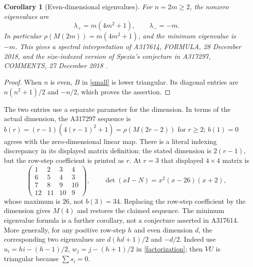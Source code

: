 \documentclass[11pt]{article}
\newtheorem{corollary}[theorem]{Corollary}
\begin{document}
\begin{corollary}[Even-dimensional eigenvalues]\label{even}
For $n=2m\geq2$, the nonzero eigenvalues are
\[
 \lambda_+=m(4m^2+1),\qquad \lambda_-=-m.
\]
In particular $\rho(M(2m))=m(4m^2+1)$, and the minimum eigenvalue
is $-m$. This gives a spectral interpretation of A317614, FORMULA,
28 December 2018, and the size-indexed version of Spezia's conjecture
in A317297, COMMENTS, 27 December 2018 \cite{eigen}.
\end{corollary}
\begin{proof}
When $n$ is even, $B$ in \eqref{small} is lower triangular. Its diagonal
entries are $n(n^2+1)/2$ and $-n/2$, which proves the assertion.
\end{proof}
The two entries use a separate parameter for the dimension.
In terms of the actual dimension, the A317297 sequence is
$b(r)=(r-1)(4(r-1)^2+1)=\rho(M(2r-2))$ for $r\geq2$;
$b(1)=0$ agrees with the zero-dimensional linear map.
There is a literal indexing discrepancy in its displayed matrix definition:
the stated dimension is $2(r-1)$, but the row-step coefficient is printed
as $r$. At $r=3$ that displayed $4\times4$ matrix is
\[
 \begin{pmatrix}1&2&3&4\\6&5&4&3\\7&8&9&10\\12&11&10&9\end{pmatrix},
 \qquad \det(xI-N)=x^2(x-26)(x+2),
\]
whose maximum is $26$, not $b(3)=34$. Replacing the row-step coefficient
by the dimension gives $M(4)$ and restores the claimed sequence.
The minimum eigenvalue formula is a further corollary, not a conjecture
asserted in A317614. More generally, for any positive row-step $h$ and even
dimension $d$, the corresponding two eigenvalues are
$d(hd+1)/2$ and $-d/2$. Indeed use
$u_i=hi-(h-1)/2$, $w_j=j-(h+1)/2$ in \eqref{factorization};
then $VU$ is triangular because $\sum s_i=0$.
\end{document}
